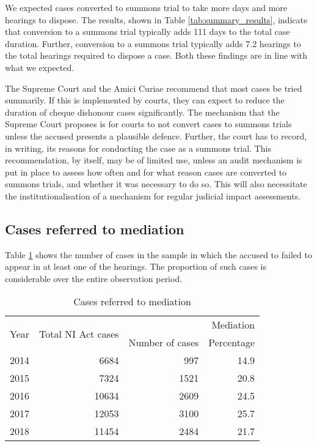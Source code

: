 We expected cases converted to summons trial to take more days and more hearings to dispose. The results, shown in Table \ref{tab:summary_results}, indicate that conversion to a summons trial typically adds 111 days to the total case duration. Further, conversion to a summons trial typically adds 7.2 hearings to the total hearings required to dispose a case. Both these findings are in line with what we expected.

The Supreme Court and the Amici Curiae recommend that most cases be tried summarily. If this is implemented by courts, they can expect to reduce the duration of cheque dishonour cases significantly. The mechanism that the Supreme Court proposes is for courts to not convert cases to summons trials unless the accused presents a plausible defence. Further, the court has to record, in writing, its reasons for conducting the case as a summons trial. This recommendation, by itself, may be of limited use, unless an audit mechanism is put in place to assess how often and for what reason cases are converted to summons trials, and whether it was necessary to do so. This will also necessitate the institutionalisation of a mechanism for regular judicial impact assessments.

\subsection{Cases referred to mediation}
\label{sec:mediation}

Table \ref{tab:mediation_yearWise} shows the number of cases in the sample in which the accused to failed to appear in at least one of the hearings. The proportion of such cases is considerable over the entire observation period.

\begin{longtable}[h!]{@{}lrrr@{}}
  \caption{Cases referred to mediation}\label{tab:mediation_yearWise}\\
\toprule
\multirow{2}{*}{Year} &  \multirow{2}{*}{Total NI Act cases} & \multicolumn{2}{p{4cm}}{Mediation}\\
\cmidrule{3-4}
&& Number of cases & Percentage \\
\midrule\endhead
2014 &   6684 &   997 &  14.9 \\
2015 &   7324 &  1521 &  20.8 \\
2016 &  10634 &  2609 &  24.5 \\
2017 &  12053 &  3100 &  25.7 \\
2018 &  11454 &  2484 &  21.7 \\
\bottomrule
\end{longtable}


